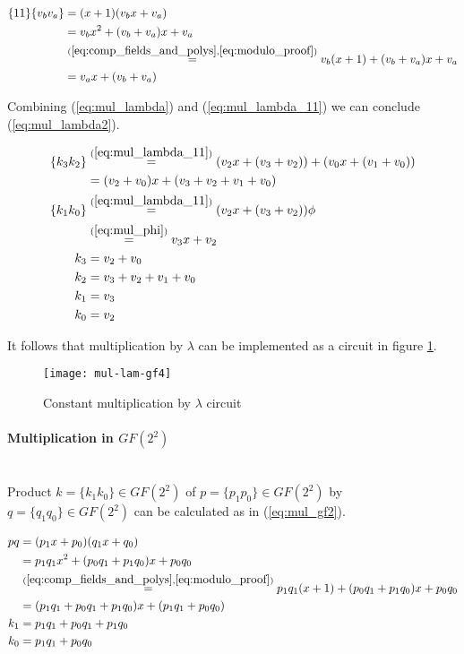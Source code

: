 \begin{equation}
\label{eq:mul_lambda_11}
\begin{aligned}
\{11\}\{v_bv_a\} &= (x + 1)(v_bx + v_a)\\
&= v_bx^2 + (v_b + v_a)x + v_a \\
&\stackrel{(\ref{eq:comp_fields_and_polys}, \ref{eq:modulo_proof})}{=}
v_b(x + 1) + (v_b + v_a)x + v_a \\
&= v_ax + (v_b + v_a)
\end{aligned}
\end{equation}

Combining (\ref{eq:mul_lambda}) and (\ref{eq:mul_lambda_11}) we can conclude (\ref{eq:mul_lambda2}).

\begin{equation}
\label{eq:mul_lambda2}
\begin{aligned}
\{k_3k_2\}
&\stackrel{(\ref{eq:mul_lambda_11})}{=}
(v_2x + (v_3 + v_2)) + (v_0x + (v_1 + v_0)) \\
&= (v_2 + v_0)x + (v_3 + v_2 + v_1 + v_0)\\
\{k_1k_0\}
&\stackrel{(\ref{eq:mul_lambda_11})}{=}
(v_2x + (v_3 + v_2))\phi \\
&\stackrel{(\ref{eq:mul_phi})}{=}
v_3x + v_2\\
k_3 &= v_2 + v_0\\
k_2 &= v_3 + v_2 + v_1 + v_0\\
k_1 &= v_3\\
k_0 &= v_2
\end{aligned}
\end{equation}


It follows that multiplication by $\lambda$ can be implemented as a circuit in figure \ref{fig:lambda_mul}.

\begin{figure}[!h]
\centering
\texttt{[image: mul-lam-gf4]}
\caption{Constant multiplication by $\lambda$ circuit}
\label{fig:lambda_mul}
\end{figure}


\paragraph{Multiplication in $GF(2^2)$}\mbox{}\\
Product $k = \{k_1k_0\} \in GF(2^2)$ of $p = \{p_1p_0\} \in GF(2^2)$ by $q = \{q_1q_0\} \in GF(2^2)$ can be calculated as in (\ref{eq:mul_gf2}).

\begin{equation}
\label{eq:mul_gf2}
\begin{aligned}
pq &= (p_1x + p_0)(q_1x + q_0)\\
&= p_1q_1x^2 + (p_0q_1 + p_1q_0)x + p_0q_0\\
&\stackrel{(\ref{eq:comp_fields_and_polys}, \ref{eq:modulo_proof})}{=}
p_1q_1(x + 1) + (p_0q_1 + p_1q_0)x + p_0q_0\\
&=(p_1q_1 + p_0q_1 + p_1q_0)x + (p_1q_1 + p_0q_0)\\
k_1 &= p_1q_1 + p_0q_1 + p_1q_0\\
k_0 &= p_1q_1 + p_0q_0
\end{aligned}
\end{equation}

